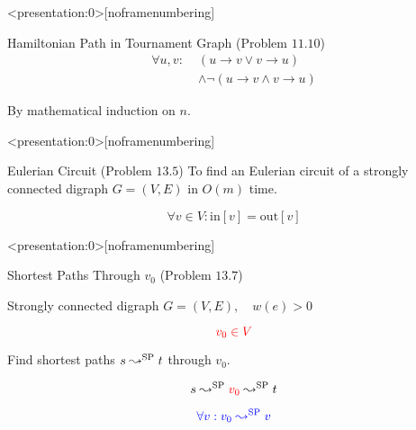 
\begin{frame}<presentation:0>[noframenumbering]
  \begin{exampleblock}{Hamiltonian Path in Tournament Graph (Problem $11.10$)}
    \begin{align*}
      \forall u, v:\; &(u \to v \lor v \to u) \\
	    &\land \lnot (u \to v \land v \to u)
    \end{align*}
  \end{exampleblock}

  \pause
  \vspace{0.60cm}
  \centerline{By mathematical induction on $n$.}
\end{frame}

\begin{frame}<presentation:0>[noframenumbering]
  \begin{exampleblock}{Eulerian Circuit (Problem $13.5$)}
    To find an Eulerian circuit of a strongly connected digraph $G = (V, E)$ in $O(m)$ time. 
  \end{exampleblock}

  \pause
  \[
    \forall v \in V: \text{in}[v] = \text{out}[v]
  \]

  \pause
\end{frame}

\begin{frame}<presentation:0>[noframenumbering]
  

  \pause
  \vspace{0.20cm}
  \centerline{}
\end{frame}

\begin{frame}
  \begin{exampleblock}{Shortest Paths Through $v_0$ (Problem $13.7$)}
    \centerline{Strongly connected digraph $G = (V, E),\quad w(e) > 0$}
    \[
      \textcolor{red}{v_0 \in V}
    \]
    \centerline{Find shortest paths $s \leadsto^{\text{SP}} t$ through $v_0$.}
  \end{exampleblock}

  \pause
  \[
    s \leadsto^{\text{SP}} \textcolor{red}{v_0} \leadsto^{\text{SP}} t
  \]

  \pause
  \[
	\textcolor{blue}{\forall v: v_0 \leadsto^{\text{SP}} v}
  \]
\end{frame}

